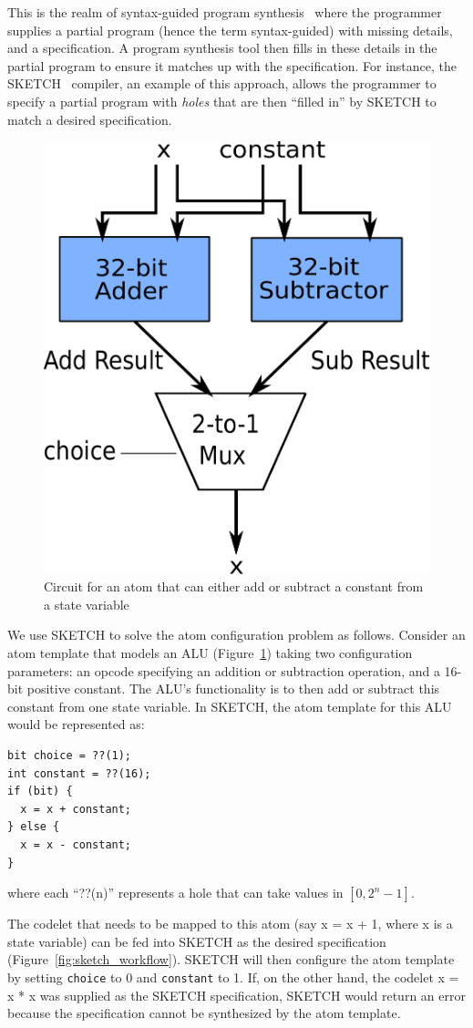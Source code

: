 This is the realm of syntax-guided program synthesis~\cite{sgsyn} where the
programmer supplies a partial program (hence the term syntax-guided) with
missing details, and a specification. A program synthesis tool then fills in
these details in the partial program to ensure it matches up with the
specification. For instance, the SKETCH~\cite{bitstreaming, sketch_asplos,
sketch_manual} compiler, an example of this approach, allows the programmer to
specify a partial program with \textit{holes} that are then ``filled in'' by
SKETCH to match a desired specification.

\begin{figure}[h]
  \begin{center}
  \includegraphics[width=0.5\columnwidth]{circuit.pdf}
  \end{center}
  \caption{Circuit for an atom that can either add or subtract a constant from a state variable}
  \label{fig:alu}
\end{figure}

We use SKETCH to solve the atom configuration problem as follows. Consider an
atom template that models an ALU (Figure~\ref{fig:alu}) taking two
configuration parameters: an opcode specifying an addition or subtraction
operation, and a 16-bit positive constant.  The ALU's functionality is to then
add or subtract this constant from one state variable. In SKETCH, the atom
template for this ALU would be represented as:
\begin{lstlisting}
bit choice = ??(1);
int constant = ??(16);
if (bit) {
  x = x + constant;
} else {
  x = x - constant;
}
\end{lstlisting}
where each ``??(n)'' represents a hole that can take values in $[0, 2^n -1]$.

The codelet that needs to be mapped to this atom (say x = x + 1, where x is a
state variable) can be fed into SKETCH as the desired specification
(Figure~\ref{fig:sketch_workflow}). SKETCH will then configure the atom
template by setting \texttt{choice} to 0 and \texttt{constant} to 1. If, on the
other hand, the codelet x = x * x was supplied as the SKETCH specification,
SKETCH would return an error because the specification cannot be synthesized by
the atom template.

